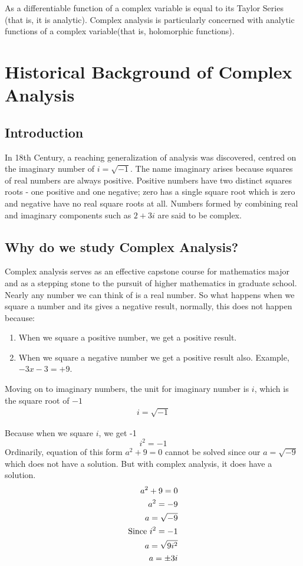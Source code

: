 \documentclass[11pt]{report}
\newcommand{\NI}{\noindent}
\begin{document}
	\NI As a differentiable function of a complex variable is equal to its Taylor Series (that is, it is analytic). Complex analysis is particularly concerned with analytic functions of a complex variable(that is, holomorphic functions).
	
	\section{Historical Background of Complex Analysis}
	\subsection{Introduction}
	In 18th Century, a reaching generalization of analysis was discovered, centred on the imaginary number of $i=\sqrt{-1}$. The name imaginary arises because squares of real numbers are always positive. Positive numbers have two distinct squares roots - one positive and one negative; zero has a single square root which is zero and negative have no real square roots at all. Numbers formed by combining real and imaginary components such as $2+3i$ are said to be complex. 
	
	\subsection{Why do we study Complex Analysis?}
	Complex analysis serves as an effective capstone course for mathematics major and as a stepping stone to the pursuit of higher mathematics in graduate school.\\
	
	\NI Nearly any number we can think of is a real number. So what happens when we square a number and its gives a negative result, normally, this does not happen because:
	\begin{enumerate}
		\item When we square a positive number, we get a positive result.
		\item When we square a negative number we get a positive result also. Example, $-3x - 3 = +9$.
	\end{enumerate}
	
	\NI Moving on to imaginary numbers, the unit for imaginary number is $i$, which is the square root of $-1$
	\begin{eqnarray}
		i=\sqrt{-1}
	\end{eqnarray}
		
	Because when we square $i$, we get -1
	\begin{equation}
		i^2 = -1
	\end{equation}
	Ordinarily, equation of this form $a^2+9=0$ cannot be solved since our $a=\sqrt{-9}$ which does not have a solution. But with complex analysis, it does have a solution.
	\begin{eqnarray}
		a^2+9=0\notag\\
		a^2=-9\notag\\
		a=\sqrt{-9}\notag\\
		\text{Since } i^2=-1\notag\\
		a = \sqrt{9 i^2}\notag\\
		a = \pm 3i\notag
	\end{eqnarray}
\end{document}
